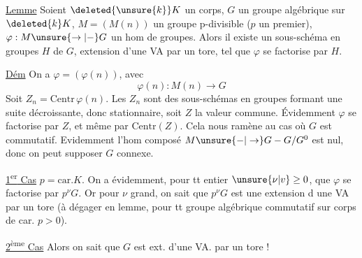 \uline{Lemme} Soient $\deleted{\unsure{k}}K$ un corps, $G$ un groupe algébrique sur $\deleted{k}K$,
$M=(M(n))$ un groupe p-divisible ($p$ un  premier),
$\varphi:M\unsure{\to|-}G$ un hom de groupes.  Alors  il existe
un sous-schéma en groupes $H$ de $G$, extension
d'une VA par un tore, tel que $\varphi$ se factorise
par $H$. 

\uline{Dém} On a $\varphi=(\varphi(n))$, avec
\[
\varphi(n):M(n)\longrightarrow G
\]
Soit $Z_n=\mathrm{Centr}\,\varphi(n)$. Les $Z_n$ sont des sous-schémas en groupes formant une suite décroissante,
donc stationnaire, soit $Z$ la valeur commune.
Évidemment $\varphi$ se factorise par  $Z$, et
même par $\mathrm{Centr}(Z)$. Cela nous ramène au
cas où $G$ est commutatif. Evidemment
 l'hom composé $M\unsure{-|\to}G-G/G^0$ est nul, donc
on peut supposer $G$ connexe.

\uline{1\textsuperscript{er} Cas} $p=\mathrm{car}. K$. On a évidemment, pour tt
entier $\unsure{\nu|v}\geq 0$, que $\varphi$ se factorise par $p^\nu G$.
Or pour $\nu$ grand, on sait  que $p^\nu G$ est
une extension d une VA par un tore (à dégager
en lemme, pour tt groupe algébrique commutatif
sur corps de car. $p>0$).

\uline{2\textsuperscript{ème} Cas}  
Alors on sait que $G$ est ext. d'une VA. par un tore !
